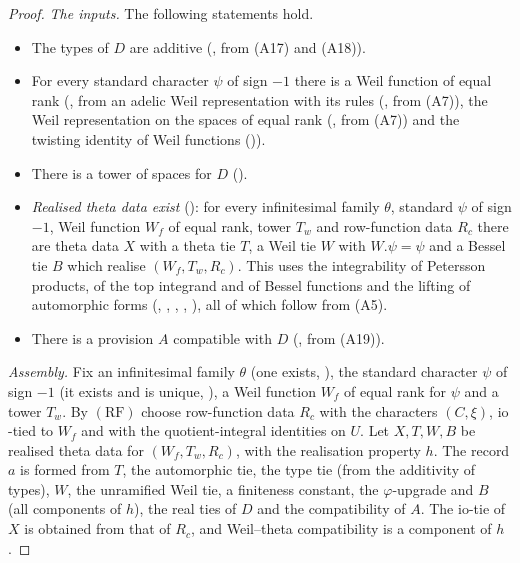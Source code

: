 \begin{proof}
\emph{The inputs.} The following statements hold.
\begin{itemize}
\item The types of $D$ are additive (, from (A17) and (A18)).
\item For every standard character $\psi$ of sign $-1$ there is a Weil function of equal rank
  (, from an adelic Weil representation with its rules
  (, from (A7)), the Weil representation on the
  spaces of equal rank (, from (A7)) and the
  twisting identity of Weil functions ()).
\item There is a tower of spaces for $D$ ().
\item \emph{Realised theta data exist} (): for every
  infinitesimal family $\theta$, standard $\psi$ of sign $-1$, Weil function $W_f$ of equal rank, tower $T_w$ and
  row-function data $R_c$ there are theta data $X$ with a theta tie $T$, a Weil tie $W$ with $W.\psi=\psi$ and a Bessel tie
  $B$ which realise $(W_f,T_w,R_c)$. This uses the integrability of Petersson products, of the top integrand and of
  Bessel functions and the lifting of automorphic forms
  (, ,
  , ,
  ), all of which follow from (A5).
\item There is a provision $A$ compatible with $D$ (, from
  (A19)).
\end{itemize}

\emph{Assembly.} Fix an infinitesimal family $\theta$ (one exists,
), the standard character $\psi$ of sign $-1$ (it exists and is
unique, ), a Weil function $W_f$ of equal rank for $\psi$
and a tower $T_w$. By $(\mathrm{RF})$ choose row-function data $R_c$ with the characters $(C,\xi)$, $\mathrm{io}$-tied to
$W_f$ and with the quotient-integral identities on $U$. Let $X,T,W,B$ be realised theta data for $(W_f,T_w,R_c)$, with
the realisation property $h$. The record $a$ is formed from $T$, the automorphic tie, the type tie (from the
additivity of types), $W$, the unramified Weil tie, a finiteness constant, the $\varphi$-upgrade and $B$ (all
components of $h$), the real ties of $D$ and the compatibility of $A$. The $\mathrm{io}$-tie of $X$ is obtained from that
of $R_c$, and Weil--theta compatibility is a component of $h$.


\end{proof}
